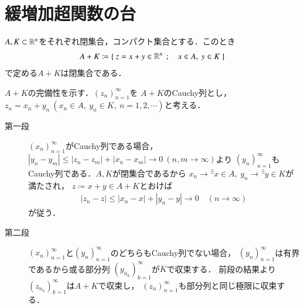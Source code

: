 \section{緩増加超関数の台}
	\begin{screen}
		\begin{lem}
			$A,K \subset \mathbb{R}^n$をそれぞれ閉集合，コンパクト集合とする．このとき
			\begin{align}
				A + K \coloneqq \left\{\ z = x + y \in \mathbb{R}^n\ \, ; \quad x \in A,\ y \in K\ \right\}
			\end{align}
			で定める$A + K$は閉集合である．
		\end{lem}
	\end{screen}
	
	\begin{prf}
		$A+K$の完備性を示す．$(z_n)_{n=1}^{\infty}$を
		$A+K$のCauchy列とし，$z_n = x_n + y_n\ (x_n \in A,\ y_n \in K,\ n=1,2,\cdots)$と考える．
		\begin{description}
			\item[第一段]
				$(x_n)_{n=1}^{\infty}$がCauchy列である場合，
				$|y_n - y_m| \leq |z_n - z_m| + |x_n - x_m| \longrightarrow 0\ (n,m \longrightarrow \infty)$より
				$(y_n)_{n=1}^{\infty}$もCauchy列である．$A,K$が閉集合であるから
				$x_n \longrightarrow {}^\exists x \in A,\ y_n \longrightarrow {}^\exists y \in K$が満たされ，
				$z \coloneqq x + y \in A + K$とおけば
				\begin{align}
					|z_n - z| \leq |x_n - x| + |y_n - y| \longrightarrow 0
					\quad (n \longrightarrow \infty)
				\end{align}
				が従う．
			
			\item[第二段]
				$(x_n)_{n=1}^{\infty}$と$(y_n)_{n=1}^{\infty}$のどちらもCauchy列でない場合，
				$(y_n)_{n=1}^{\infty}$は有界であるから或る部分列
				$(y_{n_k})_{k=1}^{\infty}$が$K$で収束する．
				前段の結果より$(z_{n_k})_{k=1}^{\infty}$は$A + K$で収束し，
				$(z_n)_{n=1}^{\infty}$も部分列と同じ極限に収束する．
				\QED
		\end{description}
	\end{prf}
	
